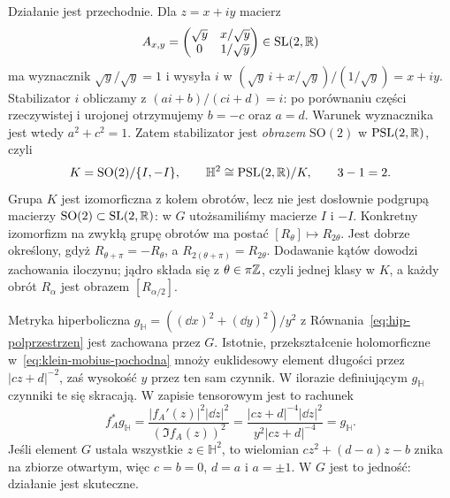 \begin{przyklad}
Działanie jest przechodnie. Dla $z=x+iy$ macierz
\[
 A_{x,y}=\begin{pmatrix}
 \sqrt y&x/\sqrt y\\0&1/\sqrt y
 \end{pmatrix}\in\mathrm{SL}(2,\mathbb{R})
\]
ma wyznacznik $\sqrt y/\sqrt y=1$ i wysyła
$i$ w $(\sqrt y\,i+x/\sqrt y)/(1/\sqrt y)=x+iy$.
Stabilizator $i$ obliczamy z
$(ai+b)/(ci+d)=i$: po porównaniu części rzeczywistej
i urojonej otrzymujemy $b=-c$ oraz $a=d$.
Warunek wyznacznika jest wtedy $a^2+c^2=1$.
Zatem stabilizator jest \emph{obrazem} $\mathrm{SO}(2)$
w $\mathrm{PSL}(2,\mathbb{R})$, czyli
\[
 K=\mathrm{SO}(2)/\{I,-I\},\qquad
 \mathbb H^2\cong\mathrm{PSL}(2,\mathbb{R})/K,
 \qquad 3-1=2.
\]
Grupa $K$ jest izomorficzna z kołem obrotów,
lecz nie jest dosłownie podgrupą macierzy
$\mathrm{SO}(2)\subset\mathrm{SL}(2,\mathbb{R})$: w $G$
utożsamiliśmy macierze $I$ i $-I$. Konkretny izomorfizm
na zwykłą grupę obrotów ma postać $[R_\theta]\mapsto R_{2\theta}$.
Jest dobrze określony, gdyż $R_{\theta+\pi}=-R_\theta$,
a $R_{2(\theta+\pi)}=R_{2\theta}$.
Dodawanie kątów dowodzi zachowania iloczynu;
jądro składa się z $\theta\in\pi\mathbb{Z}$, czyli jednej klasy w $K$,
a każdy obrót $R_\alpha$ jest obrazem $[R_{\alpha/2}]$.

Metryka hiperboliczna
$g_{\mathbb H}=((\dd x)^2+(\dd y)^2)/y^2$ z
Równania~\eqref{eq:hip-polprzestrzen} jest zachowana
przez $G$. Istotnie, przekształcenie holomorficzne
w~\eqref{eq:klein-mobius-pochodna} mnoży euklidesowy
element długości przez $|cz+d|^{-2}$, zaś wysokość
$y$ przez ten sam czynnik. W ilorazie definiującym
$g_{\mathbb H}$ czynniki te się skracają. W zapisie tensorowym
jest to rachunek
\[
 f_A^*g_{\mathbb H}
 =\frac{|f_A'(z)|^2|\dd z|^2}{(\Im f_A(z))^2}
 =\frac{|cz+d|^{-4}|\dd z|^2}{y^2|cz+d|^{-4}}
 =g_{\mathbb H}.
\]
Jeśli element $G$ ustala wszystkie $z\in\mathbb H^2$,
to wielomian
$cz^2+(d-a)z-b$ znika na zbiorze otwartym, więc
$c=b=0$, $d=a$ i $a=\pm1$. W $G$ jest to jedność:
działanie jest skuteczne.


\end{przyklad}
